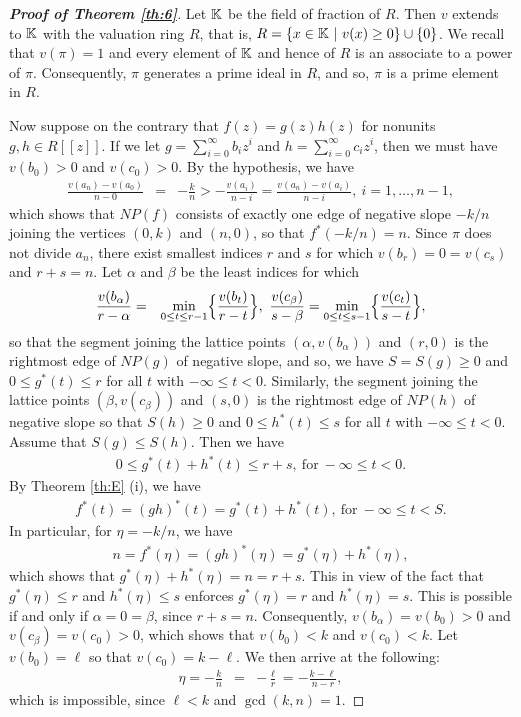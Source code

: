 \documentclass[12pt,reqno]{amsart}%
\begin{document}
\begin{proof}[\bf Proof of Theorem \ref{th:6}] Let $\mathbb{K}$ be the field of fraction of $R$. Then $v$ extends to $\mathbb{K}$ with the valuation ring $R$, that is, $R=\{x\in \mathbb{K}~|~v(x)\geq 0\}\cup\{0\}$. We recall that $v(\pi)=1$ and every element of $\mathbb{K}$ and hence of $R$ is an associate to a power of $\pi$. Consequently, $\pi$ generates a prime ideal in $R$, and so, $\pi$ is a prime element in $R$.

Now suppose on the contrary that $f(z)=g(z)h(z)$ for nonunits $g,h\in R[[z]]$. If we let $g=\sum_{i=0}^\infty b_i z^i$ and $h=\sum_{i=0}^\infty c_i z^i$, then we must have $v(b_0)>0$ and $v(c_0)>0$. By the hypothesis, we have
 \begin{eqnarray*}
 \frac{v(a_n)-v(a_0)}{n-0} &=& -\frac{k}{n}> -\frac{v(a_i)}{n-i}= \frac{v(a_n)-v(a_i)}{n-i},~i=1,\ldots,n-1,
 \end{eqnarray*}
 which shows that $NP(f)$ consists of exactly one edge  of negative slope $-k/n$ joining the vertices $(0,k)$ and $(n,0)$, so that $f^*(-k/n)=n$. Since $\pi$ does not divide $a_{n}$, there exist smallest indices $r$ and $s$ for which $v(b_r)=0=v(c_s)$ and $r+s=n$. Let $\alpha$ and $\beta$ be the least indices for which
 \begin{eqnarray*}
 \frac{v(b_\alpha)}{r-\alpha}&=&\min_{0\leq t\leq r-1}\Bigl\{\frac{v(b_t)}{r-t}\Bigr\},~
 \frac{v(c_\beta)}{s-\beta}=\min_{0\leq t\leq s-1}\Bigl\{\frac{v(c_t)}{s-t}\Bigr\},
 \end{eqnarray*}
so that the segment joining the lattice points $(\alpha,v(b_\alpha))$ and $(r,0)$ is the rightmost edge of $NP(g)$ of negative slope, and so, we have $S=S(g)\geq 0$ and $0\leq g^*(t)\leq r$ for all $t$ with $-\infty\leq t<0$. Similarly, the segment joining the lattice points $(\beta,v(c_\beta))$ and $(s,0)$ is the rightmost edge of $NP(h)$ of negative slope  so that $S(h)\geq 0$ and $0\leq h^*(t)\leq s$ for all $t$ with $-\infty \leq t<0$.  Assume that $S(g)\leq S(h)$. Then we have
 \begin{eqnarray*}
 0\leq g^*(t)+h^*(t)\leq r+s,~\text{for}~-\infty\leq t<0.
 \end{eqnarray*}
 By Theorem \ref{th:E} (i), we have
 \begin{eqnarray*}
 f^*(t)=(gh)^*(t)=g^*(t)+h^*(t),~\text{for}~-\infty \leq t<S.
 \end{eqnarray*}
In particular, for $\eta=-k/n$, we have
\begin{eqnarray*}
n=f^*(\eta)=(gh)^*(\eta)=g^*(\eta)+h^*(\eta),
 \end{eqnarray*}
which shows that $g^*(\eta)+h^*(\eta)=n=r+s$. This in view of the fact that $g^*(\eta)\leq r$ and $h^*(\eta)\leq s$ enforces $g^*(\eta)=r$ and $h^*(\eta)=s$. This is possible if and only if
$\alpha=0=\beta$, since $r+s=n$. Consequently, $v(b_\alpha)=v(b_0)>0$ and $v(c_\beta)=v(c_0)>0$, which shows that $v(b_0)<k$ and $v(c_0)<k$. Let $v(b_0)=\ell$ so that $v(c_0)=k-\ell$. We then arrive at the following:
 \begin{eqnarray*}
\eta= -\frac{k}{n} &=& -\frac{\ell}{r}=-\frac{k-\ell}{n-r},
 \end{eqnarray*}
 which is impossible, since $\ell<k$ and $\gcd(k,n)=1$.
\end{proof}
\end{document}
